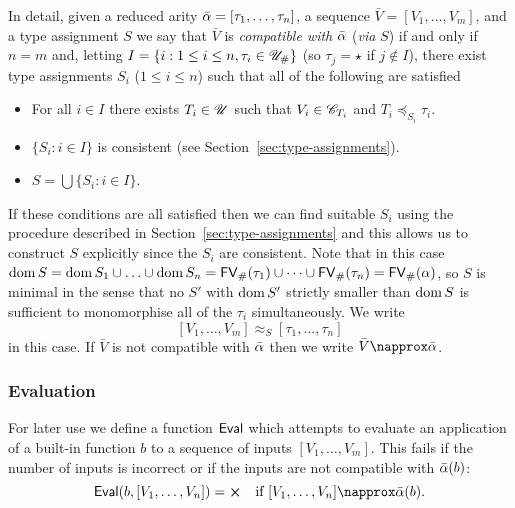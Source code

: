 \noindent{}

\noindent{}

\noindent{}

\medskip
\noindent In detail, given a reduced arity $\bar{\alpha} = [\tau_1, \ldots,
  \tau_n]$, a sequence $\bar{V} = [V_1, \ldots, V_m]$, and a type assignment $S$
we say that $\bar{V}$ is \textit{compatible with} $\bar{\alpha}$ (\textit{via} $S$)
if and only if $n=m$ and, letting $I = \{i: 1 \leq i \leq n, \tau_i \in
{\mathscr{U}_{\#}}\}$ (so $\tau_j = \star$ if $j \notin I$), there exist type
assignments $S_i$ ($1 \leq i \leq n$) such that all of the following are
satisfied
\begin{itemize}
\item For all $i \in I$ there exists $T_i \in \mathscr{U}$ such that $V_i \in \mathscr{C}_{T_i}$ and $T_i \preceq_{S_i} \tau_i$.
\item $\{S_i: i \in I\}$ is consistent (see Section~\ref{sec:type-assignments}).
\item $S = \bigcup\{S_i: i \in I\}$.
\end{itemize}

\noindent If these conditions are all satisfied then we can find suitable $S_i$
using the procedure described in Section~\ref{sec:type-assignments} and this
allows us to construct $S$ explicitly since the $S_i$ are consistent.  Note that
in this case $\operatorname{dom} S = \operatorname{dom} S_1 \cup \ldots \cup \operatorname{dom} S_n = \mathsf{FV}_{\#}(\tau_1) \cup
\cdots \cup \mathsf{FV}_{\#}(\tau_n) = \mathsf{FV}_{\#}(\alpha)$, so $S$ is minimal in the sense that no
$S'$ with $\operatorname{dom} S'$ strictly smaller than $\operatorname{dom} S$ is sufficient
to monomorphise all of the $\tau_i$ simultaneously.  We write
$$
[V_1, \ldots, V_m] \approx_S [\tau_1, \ldots, \tau_n]
$$
in this case.  If $\bar{V}$ is not compatible with $\bar{\alpha}$ then we write
$\bar{V} \napprox \alphabar$.%

\subsubsection{Evaluation}
\label{sec:eval}
For later use we define a function $\mathsf{Eval}$ which attempts to evaluate an
application of a built-in function $b$ to a sequence of inputs $[V_1, \ldots,
  V_m]$.  This fails if the number of inputs is incorrect or if the inputs are
not compatible with $\bar{\alpha}(b)$:
$$
\Eval(b,[V_1, \ldots, V_n]) = \errorX \quad \text{if $[V_1, \ldots, V_n] \napprox \alphabar(b)$}.
$$

